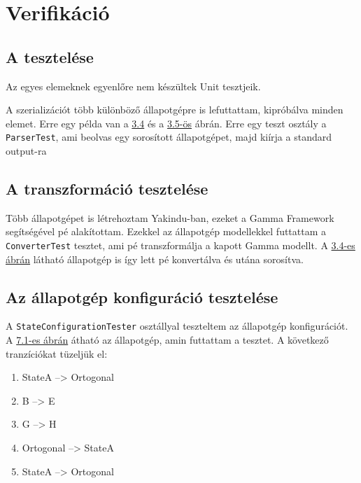 \chapter{Verifikáció}
\label{sec:verifikacio}

\section{A {\thetaSc} tesztelése}
Az egyes elemeknek egyenlőre nem készültek Unit tesztjeik.

A szerializációt több különböző állapotgépre is lefuttattam, kipróbálva minden elemet. Erre egy példa van a \hyperref[fig:serializeexample]{3.4} és a \hyperref[fig:serializeresult]{3.5-ös} ábrán.
Erre egy teszt osztály a \verb+ParserTest+, ami beolvas egy sorosított állapotgépet, majd kiírja a standard output-ra


\section{A transzformáció tesztelése}
Több állapotgépet is létrehoztam Yakindu-ban, ezeket a Gamma Framework segítségével {\gammaSc}pé alakítottam. Ezekkel az állapotgép modellekkel futtattam a \verb+ConverterTest+ tesztet, ami {\thetaSc}pé transzformálja a kapott Gamma modellt. A \hyperref[fig:serializeexample]{3.4-es ábrán} látható állapotgép is így lett {\thetaSc}pé konvertálva és utána sorosítva.


\section{Az állapotgép konfiguráció tesztelése}
A \verb+StateConfigurationTester+ osztállyal teszteltem az állapotgép konfigurációt. A \hyperref[fig:configexample]{7.1-es ábrán} átható az állapotgép, amin futtattam a tesztet. A következő tranzíciókat tüzeljük el: 
\begin{enumerate}
	\item StateA --> Ortogonal
	\item B --> E
	\item G --> H
	\item Ortogonal --> StateA
	\item StateA --> Ortogonal
\end{enumerate}

